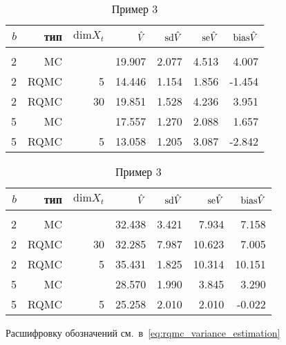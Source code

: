 \begin{table}
    \caption{Пример 2}\label{tbl:lsm_sobol_ex2}
    \begin{tabular}{rrrrrrr}
        $b$&тип&$\mathrm{dim} X_t$&$\hat{V}$&$\mathrm{sd}\hat{V}$&$\mathrm{se}\hat{V}$&$\mathrm{bias}\hat{V}$\\[3pt]\hline\\[-8pt]
        2&MC&&19.907&2.077&4.513&4.007\\
        2&RQMC&5&14.446&1.154&1.856&-1.454\\
        2&RQMC&30&19.851&1.528&4.236&3.951\\[3pt]
        5&MC&&17.557&1.270&2.088&1.657\\
        5&RQMC&5&13.058&1.205&3.087&-2.842\\[3pt]
    \end{tabular}

    \caption{Пример 3}\label{tbl:lsm_sobol_ex3}
    \begin{tabular}{rrrrrrr}
        $b$&тип&$\mathrm{dim} X_t$&$\hat{V}$&$\mathrm{sd}\hat{V}$&$\mathrm{se}\hat{V}$&$\mathrm{bias}\hat{V}$\\[3pt]\hline\\[-8pt]
        2&MC&&32.438&3.421&7.934&7.158\\
        2&RQMC&30&32.285&7.987&10.623&7.005\\
        2&RQMC&5&35.431&1.825&10.314&10.151\\[3pt]
        5&MC&&28.570&1.990&3.845&3.290\\
        5&RQMC&5&25.258&2.010&2.010&-0.022\\[3pt]
    \end{tabular}

    \footnotesize{Расшифровку обозначений см.~в~\ref{eq:rqmc_variance_estimation}}
\end{table}

